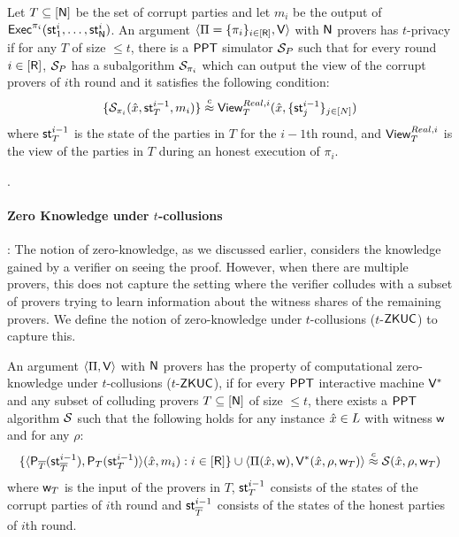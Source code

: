 \begin{definition}
Let $T\subseteq [\mathsf{N}]$ be the set of corrupt parties and let $m_i$ be the output of $\mathsf{Exec}^{\pi_i}(\mathsf{st}^i_1, \ldots, \mathsf{st}^i_{\mathsf{N}})$. An argument $\langle \Pi = \{\pi_i\}_{i \in [\mathsf{R}]},\mathsf{V}\rangle$ with $\mathsf{N}$ provers has $t$-privacy if for any $T$ of size $\leq t$, there is a $\mathsf{PPT}$ simulator $\mathcal{S}_{P}$ such that for every round $i \in [\mathsf{R}]$, $\mathcal{S}_{P}$ has a subalgorithm  $\mathcal{S}_{\pi_i}$ which can output the view of the corrupt provers of  $i$th round and it satisfies the following condition: 
\[
 \{ \mathcal{S}_{\pi_i} (\hat{x}, \mathsf{st}^{i-1}_T, m_i) \} \stackrel{c}{\approx}  \mathsf{View}^{Real, i}_T ( \hat{x}, \{\mathsf{st}^{i-1}_j\}_{j \in [N]}) 
\]
where $\mathsf{st}^{i-1}_T$ is the state of the parties in $T$ for the $i-1$th round, and $\mathsf{View}^{Real, i}_T$ is the view of the parties in $T$ during an honest execution of $\pi_i$.
\end{definition}
.

\paragraph{Zero Knowledge under $t$-collusions}: 
The notion of zero-knowledge, as we discussed earlier, considers the knowledge gained by a verifier on seeing the proof. However, when there are multiple provers, this does not capture the setting where the verifier colludes with a subset of provers trying to learn information about the witness shares of the remaining provers. We define the notion of zero-knowledge under $t$-collusions ($t$-$\mathsf{ZKUC}$) to capture this.

\begin{definition}
An argument $\langle \Pi,\mathsf{V}\rangle$ with $\mathsf{N}$ provers has the property of computational zero-knowledge under $t$-collusions ($t$-$\mathsf{ZKUC}$), if for every $\mathsf{PPT}$ interactive machine $\mathsf{V}^*$ and any subset of colluding provers $T\subseteq [\mathsf{N}]$ of size $\leq t$, there exists a $\mathsf{PPT}$ algorithm $\mathcal{S}$ such that the following holds for any instance $\hat{x} \in L$ with witness $\mathsf{w}$ and for any $\rho$: 
\[
 \{ \langle  \mathsf{P}_{\overline{T}}( \mathsf{st}^{i-1}_{\overline{T}} ) , \mathsf{P}_T ( \mathsf{st}^{i-1}_T ) \rangle ( \hat{x}  , m_i): i\in [\mathsf{R}] \} \cup \langle \Pi(\hat{x}, \mathsf{w}),\mathsf{V}^*(\hat{x}, \rho, \mathsf{w}_T)\rangle  \stackrel{c}{\approx}  \mathcal{S} (\hat{x}, \rho, \mathsf{w}_T)
\]
where $\mathsf{w}_T$ is the input of the provers in $T$, $\mathsf{st}^{i-1}_T$ consists of the states of the corrupt parties of $i$th round and $\mathsf{st}^{i-1}_{\overline{T}}$ consists of the states of the honest parties of $i$th round. 

\end{definition}

